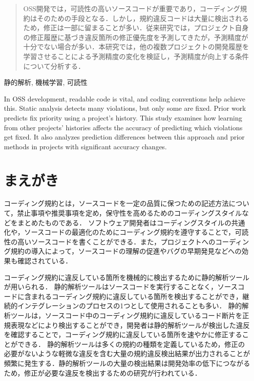 \documentclass[paper]{ieicej}
\newcommand{\todo}[1]{\colorbox{yellow}{{\bf TODO}:}{\color{red} {\textbf{[#1]}}}}
\begin{document}
\begin{abstract}
OSS開発では，可読性の高いソースコードが重要であり，コーディング規約はそのための手段となる．しかし，規約違反コードは大量に検出されるため，修正は一部に留まることが多い．従来研究では，プロジェクト自身の修正履歴に基づき違反箇所の修正優先度を予測してきたが，予測精度が十分でない場合が多い．本研究では，他の複数プロジェクトの開発履歴を学習させることによる予測精度の変化を検証し，予測精度が向上する条件について分析する．
\end{abstract}
\begin{keyword}
静的解析, 機械学習, 可読性
\end{keyword}
\begin{eabstract}
In OSS development, readable code is vital, and coding conventions help achieve this. Static analysis detects many violations, but only some are fixed. Prior work predicts fix priority using a project's history. This study examines how learning from other projects' histories affects the accuracy of predicting which violations get fixed. It also analyzes prediction differences between this approach and prior methods in projects with significant accuracy changes.
\end{eabstract}
\begin{ekeyword}
\end{ekeyword}
\maketitle

\section{まえがき}
コーディング規約とは，ソースコードを一定の品質に保つための記述方法について，禁止事項や推奨事項を定め，保守性を高めるためのコーディングスタイルなどをまとめたものである．
ソフトウェア開発者はコーディングスタイルの共通化や，ソースコードの最適化のためにコーディング規約を遵守することで，可読性の高いソースコードを書くことができる\cite{EffectsSAT}．また，プロジェクトへのコーディング規約の導入によって，ソースコードの理解の促進やバグの早期発見などへの効果も確認されている\cite{Beller2}\cite{Johnson}\cite{Beller}．

コーディング規約に違反している箇所を機械的に検出するために静的解析ツールが用いられる．
静的解析ツールはソースコードを実行することなく，ソースコードに含まれるコーディング規約に違反している箇所を検出することができ，継続的インテグレーションのプロセスの1つとして使用されることも多い．
静的解析ツールは，ソースコード中のコーディング規約に違反しているコード断片を正規表現などにより検出することができ，開発者は静的解析ツールが検出した違反を確認することで，コーディング規約に違反している箇所を速やかに修正することができる．
静的解析ツールは多くの規約の種類を定義しているため，修正の必要がないような軽微な違反を含む大量の規約違反検出結果が出力されることが頻繁に発生する．静的解析ツールの大量の検出結果は開発効率の低下につながるため，修正が必要な違反を検出するための研究が行われている\cite{Nguyen}．
\end{document}
